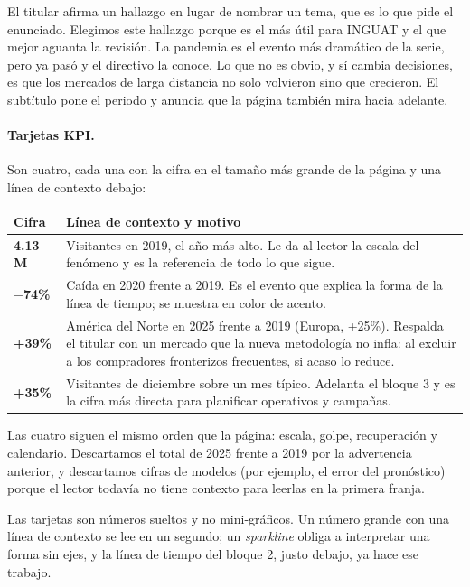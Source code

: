 El titular afirma un hallazgo en lugar de nombrar un tema, que es lo que pide el
enunciado. Elegimos este hallazgo porque es el más útil para INGUAT y el que mejor
aguanta la revisión. La pandemia es el evento más dramático de la serie, pero ya
pasó y el directivo la conoce. Lo que no es obvio, y sí cambia decisiones, es que
los mercados de larga distancia no solo volvieron sino que crecieron. El
subtítulo pone el periodo y anuncia que la página también mira hacia adelante.

\paragraph{Tarjetas KPI.} Son cuatro, cada una con la cifra en el tamaño más
grande de la página y una línea de contexto debajo:

\begin{center}
\begin{tabularx}{\textwidth}{@{}lX@{}}
\toprule
Cifra & Línea de contexto y motivo \\
\midrule
\textbf{4.13 M} & Visitantes en 2019, el año más alto. Le da al lector la escala del
fenómeno y es la referencia de todo lo que sigue. \\
\textbf{$-$74\%} & Caída en 2020 frente a 2019. Es el evento que explica la forma de
la línea de tiempo; se muestra en color de acento. \\
\textbf{+39\%} & América del Norte en 2025 frente a 2019 (Europa, +25\%). Respalda
el titular con un mercado que la nueva metodología no infla: al excluir a los
compradores fronterizos frecuentes, si acaso lo reduce. \\
\textbf{+35\%} & Visitantes de diciembre sobre un mes típico. Adelanta el bloque 3 y
es la cifra más directa para planificar operativos y campañas. \\
\bottomrule
\end{tabularx}
\end{center}

Las cuatro siguen el mismo orden que la página: escala, golpe, recuperación y
calendario. Descartamos el total de 2025 frente a 2019 por la advertencia
anterior, y descartamos cifras de modelos (por ejemplo, el error del pronóstico)
porque el lector todavía no tiene contexto para leerlas en la primera franja.

Las tarjetas son números sueltos y no mini-gráficos. Un número grande con una
línea de contexto se lee en un segundo; un \emph{sparkline} obliga a interpretar
una forma sin ejes, y la línea de tiempo del bloque 2, justo debajo, ya hace ese
trabajo.

